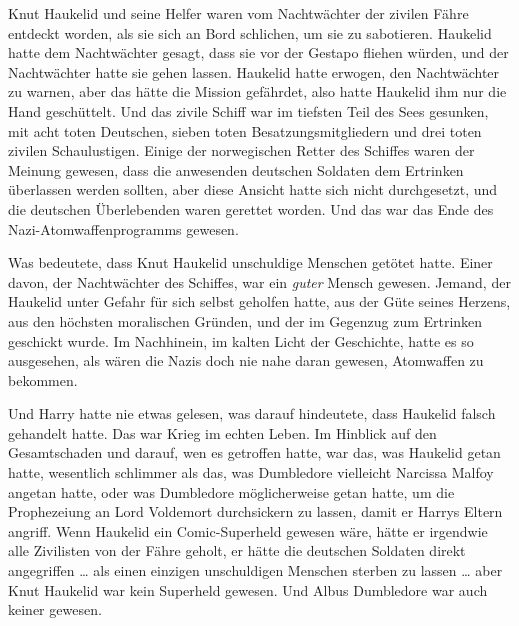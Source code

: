Knut Haukelid und seine Helfer waren vom Nachtwächter der zivilen Fähre entdeckt worden, als sie sich an Bord schlichen, um sie zu sabotieren. Haukelid hatte dem Nachtwächter gesagt, dass sie vor der Gestapo fliehen würden, und der Nachtwächter hatte sie gehen lassen. Haukelid hatte erwogen, den Nachtwächter zu warnen, aber das hätte die Mission gefährdet, also hatte Haukelid ihm nur die Hand geschüttelt. Und das zivile Schiff war im tiefsten Teil des Sees gesunken, mit acht toten Deutschen, sieben toten Besatzungsmitgliedern und drei toten zivilen Schaulustigen. Einige der norwegischen Retter des Schiffes waren der Meinung gewesen, dass die anwesenden deutschen Soldaten dem Ertrinken überlassen werden sollten, aber diese Ansicht hatte sich nicht durchgesetzt, und die deutschen Überlebenden waren gerettet worden. Und das war das Ende des Nazi-Atomwaffenprogramms gewesen.

Was bedeutete, dass Knut Haukelid unschuldige Menschen getötet hatte. Einer davon, der Nachtwächter des Schiffes, war ein \emph{guter} Mensch gewesen. Jemand, der Haukelid unter Gefahr für sich selbst geholfen hatte, aus der Güte seines Herzens, aus den höchsten moralischen Gründen, und der im Gegenzug zum Ertrinken geschickt wurde.
Im Nachhinein, im kalten Licht der Geschichte, hatte es so ausgesehen, als wären die Nazis doch nie nahe daran gewesen, Atomwaffen zu bekommen.

Und Harry hatte nie etwas gelesen, was darauf hindeutete, dass Haukelid falsch gehandelt hatte.
Das war Krieg im echten Leben. Im Hinblick auf den Gesamtschaden und darauf, wen es getroffen hatte, war das, was Haukelid getan hatte, wesentlich schlimmer als das, was Dumbledore vielleicht Narcissa Malfoy angetan hatte, oder was Dumbledore möglicherweise getan hatte, um die Prophezeiung an Lord Voldemort durchsickern zu lassen, damit er Harrys Eltern angriff.
Wenn Haukelid ein Comic-Superheld gewesen wäre, hätte er irgendwie alle Zivilisten von der Fähre geholt, er hätte die deutschen Soldaten direkt angegriffen …
als einen einzigen unschuldigen Menschen sterben zu lassen …
aber Knut Haukelid war kein Superheld gewesen.
Und Albus Dumbledore war auch keiner gewesen.

